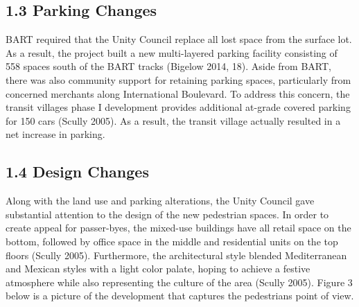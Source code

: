 \documentclass{article}
\begin{document}
\subsection*{1.3 Parking Changes}

BART required that the Unity Council replace all lost space from the surface lot. As a result, the project built a new multi-layered parking facility consisting of 558 spaces south of the BART tracks (Bigelow 2014, 18).  Aside from BART, there was also community support for retaining parking spaces, particularly from concerned merchants along International Boulevard. To address this concern, the transit village\textquotesingle s phase I development provides additional at-grade covered parking for 150 cars (Scully 2005). As a result, the transit village actually resulted in a net increase in parking.  \\

\subsection*{1.4 Design Changes}

Along with the land use and parking alterations, the Unity Council gave substantial attention to the design of the new pedestrian spaces. In order to create appeal for passer-byes, the mixed-use buildings have all retail space on the bottom, followed by office space in the middle and residential units on the top floors (Scully 2005). Furthermore, the architectural style blended Mediterranean and Mexican styles with a light color palate, hoping to achieve a festive atmosphere while also representing the culture of the area (Scully 2005). Figure 3 below is a picture of the development that captures the pedestrian\textquotesingle s point of view. \\
\end{document}
